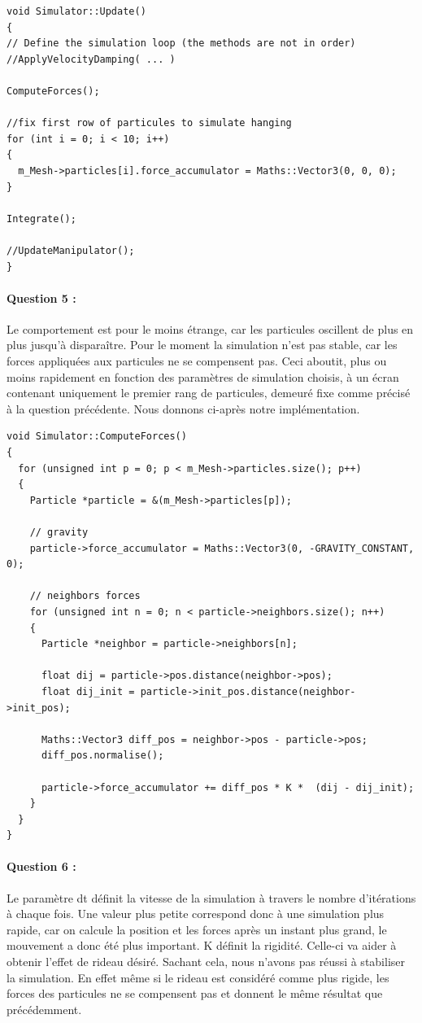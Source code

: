 \documentclass[a4paper,12pt]{article}
\begin{document}
  \begin{lstlisting}
void Simulator::Update()
{
// Define the simulation loop (the methods are not in order)
//ApplyVelocityDamping( ... )

ComputeForces();

//fix first row of particules to simulate hanging
for (int i = 0; i < 10; i++)
{
  m_Mesh->particles[i].force_accumulator = Maths::Vector3(0, 0, 0);
}

Integrate();

//UpdateManipulator();
}
  \end{lstlisting}
 

\paragraph{Question 5 :} Le comportement est pour le moins étrange, car les particules oscillent de plus en plus jusqu'à disparaître. Pour le moment la simulation n'est pas stable, car les forces appliquées aux particules ne se compensent pas. Ceci aboutit, plus ou moins rapidement en fonction des paramètres de simulation choisis, à un écran contenant uniquement le premier rang de particules, demeuré fixe comme précisé à la question précédente.
Nous donnons ci-après notre implémentation.
\begin{lstlisting}
void Simulator::ComputeForces()
{
  for (unsigned int p = 0; p < m_Mesh->particles.size(); p++)
  {
    Particle *particle = &(m_Mesh->particles[p]);

    // gravity
    particle->force_accumulator = Maths::Vector3(0, -GRAVITY_CONSTANT, 0);
    
    // neighbors forces
    for (unsigned int n = 0; n < particle->neighbors.size(); n++)
    {
      Particle *neighbor = particle->neighbors[n];

      float dij = particle->pos.distance(neighbor->pos);
      float dij_init = particle->init_pos.distance(neighbor->init_pos);

      Maths::Vector3 diff_pos = neighbor->pos - particle->pos;
      diff_pos.normalise();

      particle->force_accumulator += diff_pos * K *  (dij - dij_init);
    }
  }
}
\end{lstlisting}

\paragraph{Question 6 :} Le paramètre \og{}dt\fg{} définit la vitesse de la simulation à travers le nombre d'itérations à chaque fois. Une valeur plus petite correspond donc à une simulation plus rapide, car on calcule la position et les forces après un instant plus grand, le mouvement a donc été plus important.
K définit la rigidité. Celle-ci va aider à obtenir l'effet de rideau désiré. Sachant cela, nous n'avons pas réussi à stabiliser la simulation. En effet même si le rideau est considéré comme plus rigide, les forces des particules ne se compensent pas et donnent le même résultat que précédemment.
\end{document}
